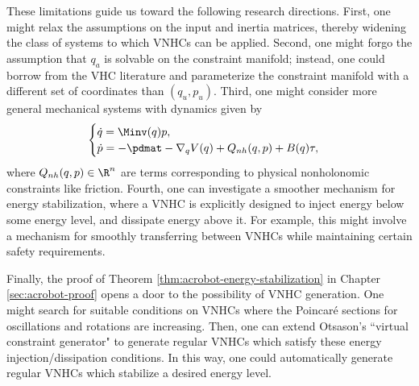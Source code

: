 These limitations guide us toward the following research directions. 
First, one might relax the assumptions on the input and inertia
matrices, thereby widening the class of systems to which VNHCs can be applied.
Second, one might forgo the assumption that \(q_a\) is solvable on the
constraint manifold; instead, one could borrow from the VHC literature
and parameterize the constraint manifold with a different set of
coordinates than \((q_u,p_u)\).
Third, one might consider more general mechanical systems with dynamics given by
\[
    \begin{cases}
        \dot{q} = \Minv(q) p
        , \\
        \dot{p} = -\pdmat - \nabla_q V(q) + Q_{nh}(q,p) + B(q)\tau
        ,
    \end{cases}
\]
where \(Q_{nh}(q,p) \in \R^n\) are terms corresponding to physical nonholonomic
constraints like friction.
Fourth, one can investigate a smoother mechanism for energy stabilization, where
a VNHC is explicitly designed to inject energy below some energy level, and
dissipate energy above it.
For example, this might involve a mechanism for smoothly transferring between 
VNHCs while maintaining certain safety requirements.

Finally, the proof of Theorem \ref{thm:acrobot-energy-stabilization} 
in Chapter \ref{sec:acrobot-proof} opens a door to the possibility of VNHC generation. 
One might search for suitable conditions on VNHCs where the Poincar\'{e}
sections for oscillations and rotations are increasing.
Then, one can extend Otsason's ``virtual constraint
generator" \cite{vcg} to generate regular VNHCs which satisfy
these energy injection/dissipation conditions.
In this way, one could automatically generate regular VNHCs which stabilize a
desired energy level.

